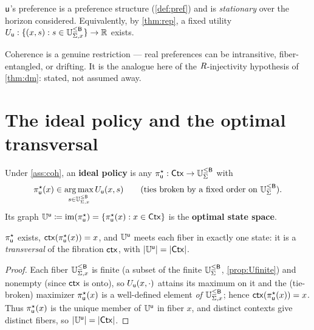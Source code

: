 \documentclass[../uxoxo-main]{subfiles}
\begin{document}
\begin{assumption}[Coherence]\label{ass:coh}
$\mathsf{u}$'s preference is a preference structure (\cref{def:pref}) and is
\emph{stationary} over the horizon considered. Equivalently, by \cref{thm:rep}, a
fixed utility $U_{\mathsf{u}}:\{(x,s):s\in\mathbb{U}_{\Sigma,x}^{\le \mathsf{B}}\}\to\mathbb{R}$ exists.
\end{assumption}

Coherence is a genuine restriction --- real preferences can be intransitive,
fiber-entangled, or drifting. It is the analogue here of the
$R$-injectivity hypothesis of \cref{thm:dm}: stated, not assumed away.

\section{The ideal policy and the optimal transversal}\label{sec:ideal}
\begin{definition}\label{def:idealpolicy}
Under \cref{ass:coh}, an \textbf{ideal policy} is any
$\pi^\star_{\mathsf{u}}:\mathsf{Ctx}\to\mathbb{U}_{\Sigma}^{\le \mathsf{B}}$ with
\[
  \pi^\star_{\mathsf{u}}(x)\in\operatorname*{arg\,max}_{s\in\mathbb{U}_{\Sigma,x}^{\le \mathsf{B}}}U_{\mathsf{u}}(x,s)\qquad(\text{ties broken by a
  fixed order on }\mathbb{U}_{\Sigma}^{\le \mathsf{B}}).
\]
Its graph $\mathbb{U}^{\mathsf{u}}\coloneqq\operatorname{im}(\pi^\star_{\mathsf{u}})=\{\pi^\star_{\mathsf{u}}(x):x\in\mathsf{Ctx}\}$
is the \textbf{optimal state space}.
\end{definition}

\begin{proposition}\label{prop:idealexists}
$\pi^\star_{\mathsf{u}}$ exists, $\mathsf{ctx}(\pi^\star_{\mathsf{u}}(x))=x$, and $\mathbb{U}^{\mathsf{u}}$ meets each
fiber in exactly one state: it is a \emph{transversal} of the fibration
$\mathsf{ctx}$, with $\lvert\mathbb{U}^{\mathsf{u}}\rvert=\lvert\mathsf{Ctx}\rvert$.
\end{proposition}

\begin{proof}
Each fiber $\mathbb{U}_{\Sigma,x}^{\le \mathsf{B}}$ is finite (a subset of the finite $\mathbb{U}_{\Sigma}^{\le \mathsf{B}}$,
\cref{prop:Ufinite}) and nonempty (since $\mathsf{ctx}$ is onto), so
$U_{\mathsf{u}}(x,\cdot)$ attains its maximum on it and the (tie-broken) maximizer
$\pi^\star_{\mathsf{u}}(x)$ is a well-defined element \emph{of $\mathbb{U}_{\Sigma,x}^{\le \mathsf{B}}$}; hence
$\mathsf{ctx}(\pi^\star_{\mathsf{u}}(x))=x$. Thus $\pi^\star_{\mathsf{u}}(x)$ is the unique member of
$\mathbb{U}^{\mathsf{u}}$ in fiber $x$, and distinct contexts give distinct fibers, so
$\lvert\mathbb{U}^{\mathsf{u}}\rvert=\lvert\mathsf{Ctx}\rvert$.
\end{proof}
\end{document}
